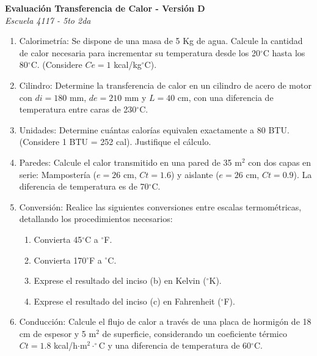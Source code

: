 \documentclass[a4paper,10pt]{article}
\newenvironment{versionexamen}[1]{
  \begin{minipage}[t]{0.48\textwidth}
    \textbf{Evaluación Transferencia de Calor - Versión #1} \\
    \textit{Escuela 4117 - 5to 2da}
    \begin{enumerate}[label=\textbf{\arabic*.}, leftmargin=15pt, topsep=4pt, itemsep=4pt]
      \small
}{
    \end{enumerate}
    \vspace{0.4cm}
  \end{minipage}
}
\begin{document}
\begin{versionexamen}{D}
	\item Calorimetría: Se dispone de una masa de 5 Kg de agua. Calcule la cantidad de calor necesaria para incrementar su temperatura desde los 20$^\circ$C hasta los 80$^\circ$C. (Considere $Ce=1$ kcal/kg$^\circ$C).
	\item Cilindro: Determine la transferencia de calor en un cilindro de acero de motor con $di=180$ mm, $de=210$ mm y $L=40$ cm, con una diferencia de temperatura entre caras de 230$^\circ$C.
	\item Unidades: Determine cuántas calorías equivalen exactamente a 80 BTU. (Considere 1 BTU = 252 cal). Justifique el cálculo.
	\item Paredes: Calcule el calor transmitido en una pared de 35 m$^2$ con dos capas en serie: Mampostería ($e=26$ cm, $Ct=1.6$) y aislante ($e=26$ cm, $Ct=0.9$). La diferencia de temperatura es de 70$^\circ$C.
	\item Conversión: Realice las siguientes conversiones entre escalas termométricas, detallando los procedimientos necesarios:
	\begin{enumerate}[label=\alph*., nosep, leftmargin=15pt]
		\item Convierta 45$^\circ$C a $^\circ$F.
		\item Convierta 170$^\circ$F a $^\circ$C.
		\item Exprese el resultado del inciso (b) en Kelvin ($^\circ$K).
		\item Exprese el resultado del inciso (c) en Fahrenheit ($^\circ$F).
	\end{enumerate}
	\item Conducción: Calcule el flujo de calor a través de una placa de hormigón de 18 cm de espesor y 5 m$^2$ de superficie, considerando un coeficiente térmico $Ct=1.8$ kcal/h$\cdot$m$^2\cdot^\circ$C y una diferencia de temperatura de 60$^\circ$C.
\end{versionexamen}
\end{document}
